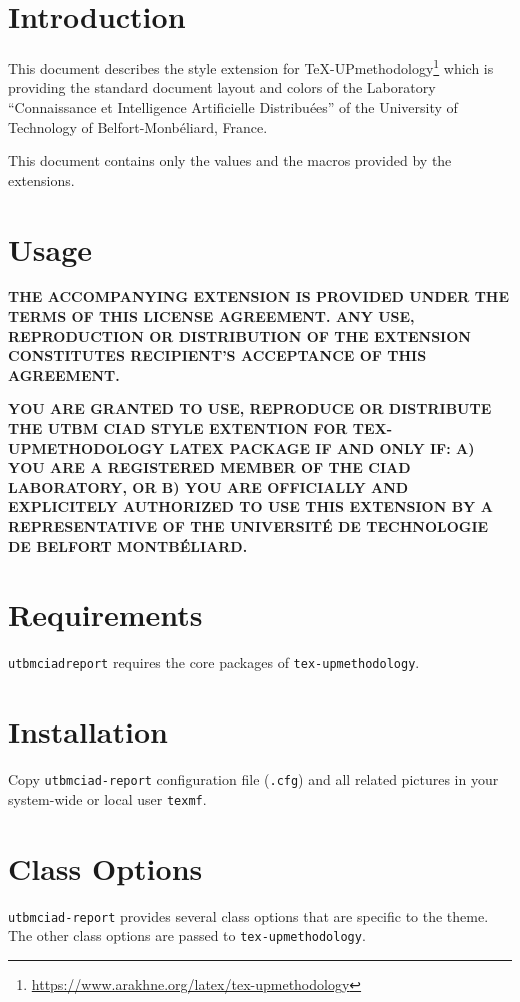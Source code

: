 \documentclass[article,nodocrefonfront,nodocrefonback]{utbmciadreport}
\begin{document}
\section{Introduction}

This document describes the style extension for TeX-UPmethodology\footnote{\url{https://www.arakhne.org/latex/tex-upmethodology}} which is providing the standard document layout and colors of the Laboratory ``Connaissance et Intelligence Artificielle Distribu\'ees'' of the University of Technology of Belfort-Monb\'eliard, France.

This document contains only the values and the macros provided by the extensions.

\section{Usage}

\textbf{THE ACCOMPANYING EXTENSION IS PROVIDED UNDER THE TERMS OF THIS LICENSE AGREEMENT. ANY USE, REPRODUCTION OR DISTRIBUTION OF THE EXTENSION CONSTITUTES RECIPIENT'S ACCEPTANCE OF THIS AGREEMENT.}

\textbf{YOU ARE GRANTED TO USE, REPRODUCE OR DISTRIBUTE THE UTBM CIAD STYLE EXTENTION FOR TEX-UPMETHODOLOGY LATEX PACKAGE IF AND ONLY IF: A) YOU ARE A REGISTERED MEMBER OF THE CIAD LABORATORY, OR B) YOU ARE OFFICIALLY AND EXPLICITELY AUTHORIZED TO USE THIS EXTENSION BY A REPRESENTATIVE OF THE UNIVERSIT\'E DE TECHNOLOGIE DE BELFORT MONTB\'ELIARD.}

\section{Requirements}

\texttt{utbmciadreport} requires the core packages of \texttt{tex-upmethodology}.

\section{Installation}

Copy \texttt{utbmciad-report} configuration file (\texttt{.cfg}) and all related pictures in your system-wide or local user \texttt{texmf}.

\section{Class Options}

\texttt{utbmciad-report} provides several class options that are specific to the theme.
The other class options are passed to \texttt{tex-upmethodology}.
\end{document}
